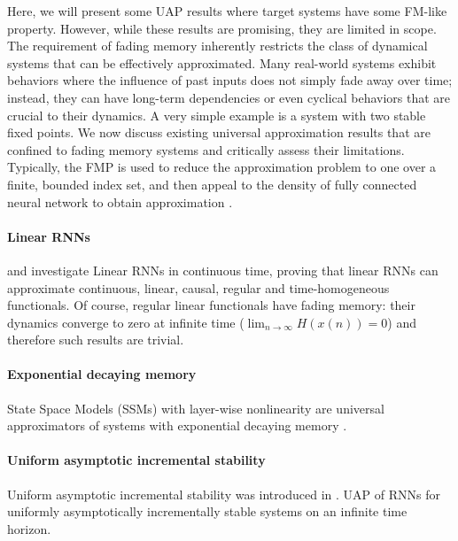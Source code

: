 \documentclass{article}
\theoremstyle{definition} \newtheorem{definition}{Definition}
\theoremstyle{remark} \newtheorem{remark}{Remark}
\newcounter{ct}
\begin{document}
Here, we will present some UAP results where target systems have some FM-like property.
However, while these results are promising, they are limited in scope.
The requirement of fading memory inherently restricts the class of dynamical systems that can be effectively approximated.
Many real-world systems exhibit behaviors where the influence of past inputs does not simply fade away over time; instead, they can have long-term dependencies or even cyclical behaviors that are crucial to their dynamics.
A very simple example is a system with two stable fixed points.
We now discuss existing universal approximation results that are confined to fading memory systems and critically assess their limitations.
%
Typically, the FMP is used to reduce the approximation problem to one over a finite, bounded index set, and then appeal to the density of fully connected neural network to obtain approximation \citep{gonon2021fading}. %


\paragraph{Linear RNNs}
\citet{li2020curse} and \citet{li2022approximation} investigate Linear RNNs in continuous time, %
proving that linear RNNs can approximate continuous, linear, causal, regular and time-homogeneous functionals. %
Of course, regular linear functionals have fading memory: their dynamics converge to zero at infinite time ($\lim_{n\rightarrow\infty} H(x(n)) = 0$) and therefore such results are trivial.
 

\paragraph{Exponential decaying memory}
State Space Models (SSMs) with layer-wise nonlinearity are universal approximators of systems with exponential decaying memory \citep{wang2024state}.


\paragraph{Uniform asymptotic incremental stability}
Uniform asymptotic incremental stability was introduced in \citep{pavlov2006uniform}.
UAP of RNNs for uniformly asymptotically incrementally stable systems on an infinite time horizon\citep{hanson2020universal, hanson2021learning}.
\end{document}
